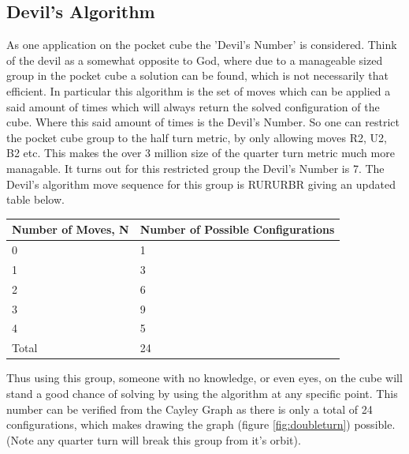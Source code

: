 \documentclass{article}
\begin{document}
\subsection{Devil's Algorithm}

As one application on the pocket cube the 'Devil's Number' is considered. Think of the devil as a somewhat opposite to God, where due to a manageable sized group in the pocket cube a solution can be found, which is not necessarily that efficient. In particular this algorithm is the set of moves which can be applied a said amount of times which will always return the solved configuration of the cube. Where this said amount of times is the Devil's Number. So one can restrict the pocket cube group to the half turn metric, by only allowing moves R2, U2, B2 etc.
This makes the over 3 million size of the quarter turn metric much more managable. It turns out for this restricted group the Devil's Number is 7\cite{Devil}.
The Devil's algorithm move sequence for this group is RURURBR giving an updated table below.

\begin{center}
\label{:thistletab}
    \begin{tabular}{ | p{6cm} | p{6cm}|}
    \hline
    Number of Moves, N  & Number of Possible Configurations \\ \hline
     0 & 1\\ \hline
     1 & 3\\ \hline
     2 & 6\\ \hline
     3 & 9\\ \hline
     4 & 5\\ \hline
     Total & 24\\ \hline
    \end{tabular}
\end{center}

Thus using this group, someone with no knowledge, or even eyes, on the cube will stand a good chance of solving by using the algorithm at any specific point. This number can be verified from the Cayley Graph as there is only a total of 24 configurations, which makes drawing the graph (figure \ref{fig:doubleturn})\cite{Devil} possible. (Note any quarter turn will break this group from it's orbit).
\end{document}
